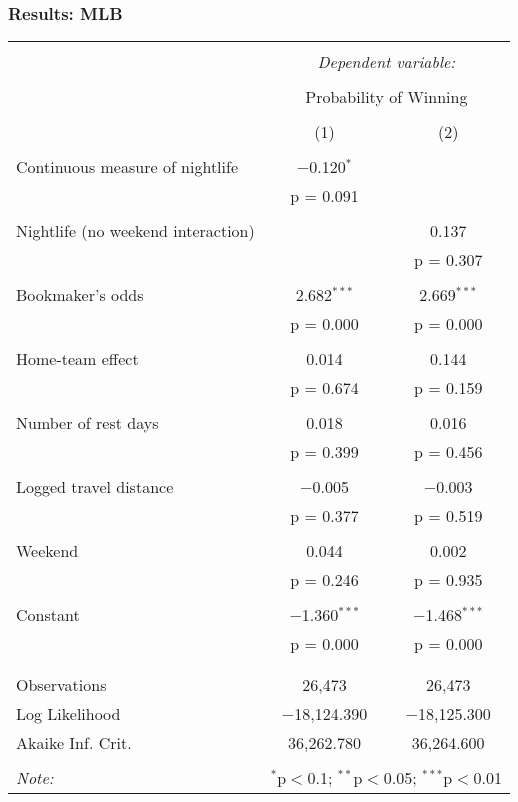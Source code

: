 \documentclass{beamer}
\begin{document}
\begin{frame}   \frametitle{Results: MLB}
  \centering
  \tiny{ %
\begin{tabular}{@{\extracolsep{5pt}}lcc}  \\[-1.8ex]\hline  \hline \\[-1.8ex]   & \multicolumn{2}{c}{\textit{Dependent variable:}} \\  \cline{2-3}  \\[-1.8ex] & \multicolumn{2}{c}{Probability of Winning} \\  \\[-1.8ex] & (1) & (2)\\  \hline \\[-1.8ex]   Continuous measure of nightlife & $-$0.120$^{*}$ &  \\    & p = 0.091 &  \\    & & \\   Nightlife (no weekend interaction) &  & 0.137 \\    &  & p = 0.307 \\    & & \\   Bookmaker's odds & 2.682$^{***}$ & 2.669$^{***}$ \\    & p = 0.000 & p = 0.000 \\    & & \\   Home-team effect & 0.014 & 0.144 \\    & p = 0.674 & p = 0.159 \\    & & \\   Number of rest days & 0.018 & 0.016 \\    & p = 0.399 & p = 0.456 \\    & & \\   Logged travel distance & $-$0.005 & $-$0.003 \\    & p = 0.377 & p = 0.519 \\    & & \\   Weekend & 0.044 & 0.002 \\    & p = 0.246 & p = 0.935 \\    & & \\   Constant & $-$1.360$^{***}$ & $-$1.468$^{***}$ \\    & p = 0.000 & p = 0.000 \\    & & \\  \hline \\[-1.8ex]  Observations & 26,473 & 26,473 \\  Log Likelihood & $-$18,124.390 & $-$18,125.300 \\  Akaike Inf. Crit. & 36,262.780 & 36,264.600 \\  \hline  \hline \\[-1.8ex]  \textit{Note:}  & \multicolumn{2}{r}{$^{*}$p$<$0.1; $^{**}$p$<$0.05; $^{***}$p$<$0.01} \\  \end{tabular}    } 
\end{frame}
\end{document}
